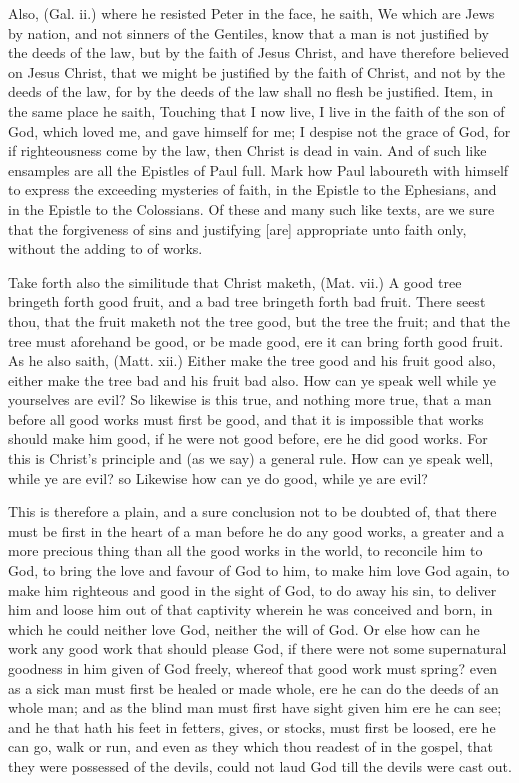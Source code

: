 \documentclass{custom}
\begin{document}
Also, (Gal. ii.) where he resisted Peter in the face, he 
saith, We which are Jews by nation, and not sinners of the 
Gentiles, know that a man is not justified by the deeds of 
the law, but by the faith of Jesus Christ, and have therefore 
believed on Jesus Christ, that we might be justified by the 
faith of Christ, and not by the deeds of the law, for by the 
deeds of the law shall no flesh be justified. Item, in the 
same place he saith, Touching that I now live, I live in the 
faith of the son of God, which loved me, and gave himself 
for me; I despise not the grace of God, for if
righteousness come by the law, then Christ is dead in vain. And 
of such like ensamples are all the Epistles of Paul full.
Mark how Paul laboureth with himself to express the
exceeding mysteries of faith, in the Epistle to the Ephesians, 
and in the Epistle to the Colossians. Of these and many 
such like texts, are we sure that the forgiveness of sins 
and justifying [are] appropriate unto faith only, without the 
adding to of works. 

Take forth also the similitude that Christ maketh, (Mat. 
vii.) A good tree bringeth forth good fruit, and a bad tree 
bringeth forth bad fruit. There seest thou, that the fruit 
maketh not the tree good, but the tree the fruit; and that 
the tree must aforehand be good, or be made good, ere it 
can bring forth good fruit. As he also saith, (Matt. xii.) 
Either make the tree good and his fruit good also, either 
make the tree bad and his fruit bad also. How can ye 
speak well while ye yourselves are evil? So likewise is this 
true, and nothing more true, that a man before all good 
works must first be good, and that it is impossible that 
works should make him good, if he were not good before, 
ere he did good works. For this is Christ's principle and 
(as we say) a general rule. How can ye speak well, 
while ye are evil? so Likewise how can ye do good, while 
ye are evil? 

This is therefore a plain, and a sure conclusion not to 
be doubted of, that there must be first in the heart of a 
man before he do any good works, a greater and a more 
precious thing than all the good works in the world, to
reconcile him to God, to bring the love and favour of God to 
him, to make him love God again, to make him righteous 
and good in the sight of God, to do away his sin, to
deliver him and loose him out of that captivity wherein he 
was conceived and born, in which he could neither love 
God, neither the will of God. Or else how can he work 
any good work that should please God, if there were not 
some supernatural goodness in him given of God freely, 
whereof that good work must spring? even as a sick man 
must first be healed or made whole, ere he can do the deeds 
of an whole man; and as the blind man must first have sight 
given him ere he can see; and he that hath his feet in 
fetters, gives, or stocks, must first be loosed, ere he can go, 
walk or run, and even as they which thou readest of in 
the gospel, that they were possessed of the devils, could 
not laud God till the devils were cast out. 
\end{document}

